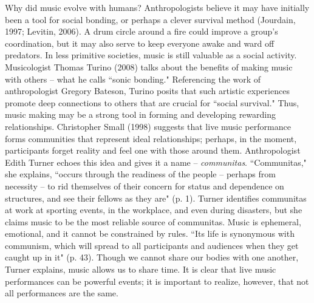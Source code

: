Why did music evolve with humans? Anthropologists believe it may have initially been a tool for social bonding, or perhaps a clever survival method (Jourdain, 1997; Levitin, 2006). A drum circle around a fire could improve a group's coordination, but it may also serve to keep everyone awake and ward off predators. In less primitive societies, music is still valuable as a social activity. Musicologist Thomas Turino (2008) talks about the benefits of making music with others -- what he calls ``sonic bonding." Referencing the work of anthropologist Gregory Bateson, Turino posits that such artistic experiences promote deep connections to others that are crucial for ``social survival." Thus, music making may be a strong tool in forming and developing rewarding relationships. Christopher Small (1998) suggests that live music performance forms communities that represent ideal relationships; perhaps, in the moment, participants forget reality and feel one with those around them. Anthropologist Edith Turner echoes this idea and gives it a name -- \textit{communitas}. ``Communitas," she explains, ``occurs through the readiness of the people -- perhaps from necessity -- to rid themselves of their concern for status and dependence on structures, and see their fellows as they are" (p. 1). Turner identifies communitas at work at sporting events, in the workplace, and even during disasters, but she claims music to be the most reliable source of communitas. Music is ephemeral, emotional, and it cannot be constrained by rules. ``Its life is synonymous with communism, which will spread to all participants and audiences when they get caught up in it" (p. 43). Though we cannot share our bodies with one another, Turner explains, music allows us to share time. It is clear that live music performances can be powerful events; it is important to realize, however, that not all performances are the same.
